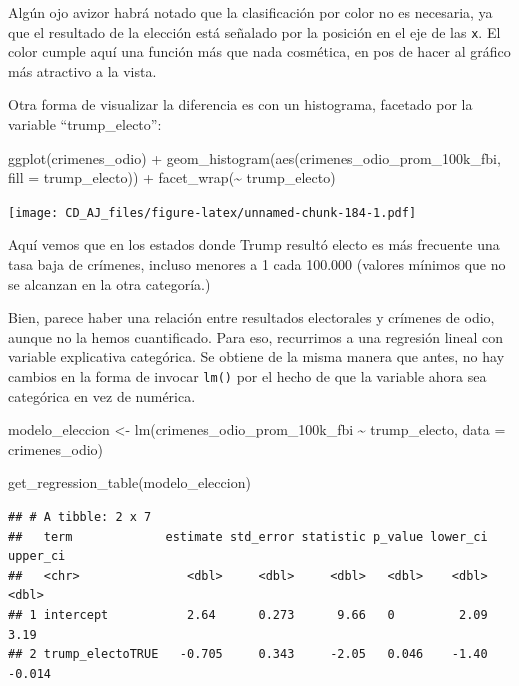 \documentclass[
]{book}
\newenvironment{Shaded}{\begin{snugshade}}{\end{snugshade}}
\newcommand{\AttributeTok}[1]{\textcolor[rgb]{0.77,0.63,0.00}{#1}}
\newcommand{\FunctionTok}[1]{\textcolor[rgb]{0.00,0.00,0.00}{#1}}
\newcommand{\NormalTok}[1]{#1}
\newcommand{\OtherTok}[1]{\textcolor[rgb]{0.56,0.35,0.01}{#1}}
\newcommand{\SpecialCharTok}[1]{\textcolor[rgb]{0.00,0.00,0.00}{#1}}
\begin{document}
Algún ojo avizor habrá notado que la clasificación por color no es necesaria, ya que el resultado de la elección está señalado por la posición en el eje de las \texttt{x}. El color cumple aquí una función más que nada cosmética, en pos de hacer al gráfico más atractivo a la vista.

Otra forma de visualizar la diferencia es con un histograma, facetado por la variable ``trump\_electo'':

\begin{Shaded}
\begin{Highlighting}[]
\FunctionTok{ggplot}\NormalTok{(crimenes\_odio) }\SpecialCharTok{+}
  \FunctionTok{geom\_histogram}\NormalTok{(}\FunctionTok{aes}\NormalTok{(crimenes\_odio\_prom\_100k\_fbi, }\AttributeTok{fill =}\NormalTok{ trump\_electo)) }\SpecialCharTok{+}
  \FunctionTok{facet\_wrap}\NormalTok{(}\SpecialCharTok{\textasciitilde{}}\NormalTok{ trump\_electo)}
\end{Highlighting}
\end{Shaded}

\texttt{[image: CD\_AJ\_files/figure-latex/unnamed-chunk-184-1.pdf]}

Aquí vemos que en los estados donde Trump resultó electo es más frecuente una tasa baja de crímenes, incluso menores a 1 cada 100.000 (valores mínimos que no se alcanzan en la otra categoría.)

Bien, parece haber una relación entre resultados electorales y crímenes de odio, aunque no la hemos cuantificado. Para eso, recurrimos a una regresión lineal con variable explicativa categórica. Se obtiene de la misma manera que antes, no hay cambios en la forma de invocar \texttt{lm()} por el hecho de que la variable ahora sea categórica en vez de numérica.

\begin{Shaded}
\begin{Highlighting}[]
\NormalTok{modelo\_eleccion }\OtherTok{\textless{}{-}} \FunctionTok{lm}\NormalTok{(crimenes\_odio\_prom\_100k\_fbi }\SpecialCharTok{\textasciitilde{}}\NormalTok{ trump\_electo, }\AttributeTok{data =}\NormalTok{ crimenes\_odio)}


\FunctionTok{get\_regression\_table}\NormalTok{(modelo\_eleccion)}
\end{Highlighting}
\end{Shaded}

\begin{verbatim}
## # A tibble: 2 x 7
##   term             estimate std_error statistic p_value lower_ci upper_ci
##   <chr>               <dbl>     <dbl>     <dbl>   <dbl>    <dbl>    <dbl>
## 1 intercept           2.64      0.273      9.66   0         2.09    3.19 
## 2 trump_electoTRUE   -0.705     0.343     -2.05   0.046    -1.40   -0.014
\end{verbatim}
\end{document}
